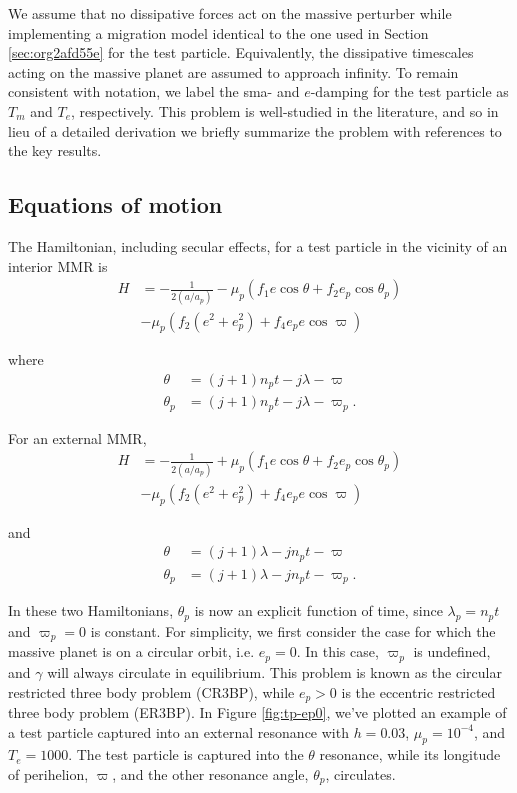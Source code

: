 \documentclass[usenatbib,twocolumn]{mnras}
\begin{document}
We assume that no dissipative forces act on the massive perturber
while implementing a migration model identical to the one used in
Section \ref{sec:org2afd55e} for the test particle.
Equivalently, the dissipative timescales acting on the massive planet
are assumed to approach infinity.  To remain consistent with notation,
we label the sma- and \(e\text{-damping}\) for the test particle as
\(T_{m}\) and \(T_{e}\), respectively. This problem is well-studied in the
literature, and so in lieu of a detailed derivation we briefly
summarize the problem with references to the key results.

\subsection{Equations of motion}
\label{sec:orgda2d316}
The Hamiltonian, including secular effects, for a test particle in the
vicinity of an interior MMR is
\citep[c.f.][]{xu_migration_2018,goldreich_overstable_2014,wisdom_canonical_1986,deck_migration_2015,henrard86_reduc_trans_apocen_librat}
\begin{align*}
  \label{eq:tpint}
  H
  &= - \frac{1}{2(a/a_p)} - \mu_p\left(f_1
    e\cos\theta +f_2 e_p\cos\theta_p\right) \\
  &- \mu_p \left(f_2\left(e^2 + e_p^2\right)
    + f_4e_p e\cos\varpi\right)
\end{align*}

\noindent
where
\begin{align}
  \theta &= (j+1)n_p t - j\lambda - \varpi \\
  \theta_p &= (j+1)n_p t - j\lambda - \varpi_p.
\end{align}

\noindent
For an external MMR, 
\begin{align*}
  \label{eq:tpext}
  H
  &= - \frac{1}{2(a/a_p)} + \mu_p\left(f_1
    e\cos\theta +f_2
    e_p\cos\theta_p\right) \\
  &- \mu_p \left(f_2\left(e^2
      + e_p^2\right) + f_4e_p
    e\cos\varpi\right)
\end{align*}

\noindent
and
\begin{align}
  \theta &= (j+1)\lambda - jn_pt - \varpi \\
  \theta_p &= (j+1)\lambda - jn_pt - \varpi_p.
\end{align}

In these two Hamiltonians, \(\theta_p\) is now an explicit function of
time, since \(\lambda_p=n_p t\) and \(\varpi_p=0\) is constant.  For
simplicity, we first consider the case for which the massive planet is
on a circular orbit, i.e. \(e_p=0\).
In this case, \(\varpi_p\) is undefined, and \(\gamma\) will
always circulate in equilibrium.
This problem is known as the circular restricted three
body problem (CR3BP), while \(e_p>0\) is the eccentric restricted three
body problem (ER3BP).  In Figure \ref{fig:tp-ep0}, we've plotted an
example of a test particle captured into an external resonance with
\(h=0.03\), \(\mu_p = 10^{-4}\), and \(T_{e} = 1000\).  The test particle is
captured into the \(\theta\) resonance, while its longitude of
perihelion, \(\varpi\), and the other resonance angle, \(\theta_p\),
circulates.
\end{document}
